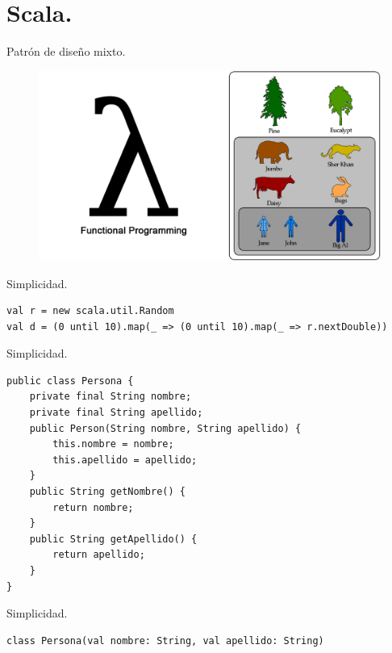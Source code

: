 \documentclass[10pt]{beamer}
\begin{document}
\section{Scala.}

\begin{frame}[fragile]{Patrón de diseño mixto.}
	\begin{figure}[H]
	\centering
	\includegraphics[width=\linewidth]{./imagenes/patron}
	\end{figure}
\end{frame}


\begin{frame}[fragile]{Simplicidad.}
\begin{lstlisting}[frame=single, basicstyle=\scriptsize, breaklines=true]
val r = new scala.util.Random
val d = (0 until 10).map(_ => (0 until 10).map(_ => r.nextDouble))
\end{lstlisting} 
\end{frame}

\begin{frame}[fragile]{Simplicidad.}
\begin{lstlisting}[frame=single, basicstyle=\scriptsize, breaklines=true]
public class Persona {
    private final String nombre;
    private final String apellido;
    public Person(String nombre, String apellido) {
        this.nombre = nombre;
        this.apellido = apellido;
    }
    public String getNombre() {
        return nombre;
    }
    public String getApellido() {
        return apellido;
    }
}
\end{lstlisting}
\end{frame}

\begin{frame}[fragile]{Simplicidad.}
\begin{lstlisting}[frame=single, basicstyle=\scriptsize, breaklines=true]
class Persona(val nombre: String, val apellido: String)
\end{lstlisting} 
\end{frame}
\end{document}

